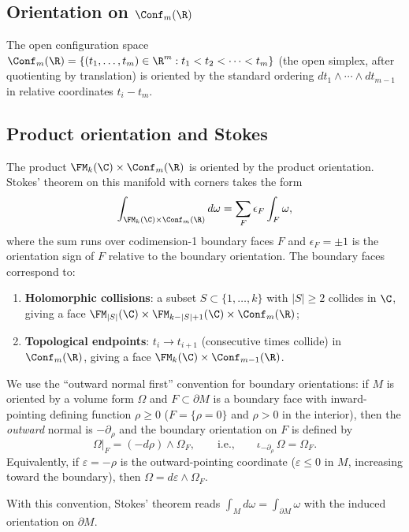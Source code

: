 \subsection{\texorpdfstring{Orientation on $\Conf_m(\R)$}{Orientation on Conf m(R)}}

The open configuration space $\Conf_m(\R) = \{(t_1,\ldots,t_m) \in \R^m : t_1 < t_2 < \cdots < t_m\}$ (the open simplex, after quotienting by translation) is oriented by the standard ordering $dt_1 \wedge \cdots \wedge dt_{m-1}$ in relative coordinates $t_i - t_m$.

\subsection{Product orientation and Stokes}

The product $\FM_k(\C) \times \Conf_m(\R)$ is oriented by the product orientation. Stokes' theorem on this manifold with corners takes the form
\begin{equation}
\label{eq:stokes-general}
\int_{\FM_k(\C) \times \Conf_m(\R)} d\omega = \sum_{F} \epsilon_F \int_F \omega,
\end{equation}
where the sum runs over codimension-1 boundary faces $F$ and $\epsilon_F = \pm 1$ is the orientation sign of $F$ relative to the boundary orientation. The boundary faces correspond to:
\begin{enumerate}
\item \textbf{Holomorphic collisions}: a subset $S \subset \{1,\ldots,k\}$ with $|S| \geq 2$ collides in $\C$, giving a face $\FM_{|S|}(\C) \times \FM_{k-|S|+1}(\C) \times \Conf_m(\R)$;
\item \textbf{Topological endpoints}: $t_i \to t_{i+1}$ (consecutive times collide) in $\Conf_m(\R)$, giving a face $\FM_k(\C) \times \Conf_{m-1}(\R)$.
\end{enumerate}

\begin{convention}
\label{conv:outward-normal}
We use the ``outward normal first'' convention for boundary orientations: if $M$ is oriented by a volume form $\Omega$ and $F\subset \partial M$ is a boundary face with inward-pointing defining function $\rho \ge 0$ ($F = \{\rho = 0\}$ and $\rho > 0$ in the interior), then the \emph{outward} normal is $-\partial_\rho$ and the boundary orientation on $F$ is defined by
\begin{equation}
\label{eq:outward-normal-rule}
\Omega\big|_F = (-d\rho) \wedge \Omega_F, \qquad\text{i.e.,}\qquad \iota_{-\partial_\rho}\,\Omega = \Omega_F.
\end{equation}
Equivalently, if $\varepsilon = -\rho$ is the outward-pointing coordinate ($\varepsilon \le 0$ in $M$, increasing toward the boundary), then $\Omega = d\varepsilon \wedge \Omega_F$.

With this convention, Stokes' theorem reads $\int_M d\omega = \int_{\partial M}\omega$ with the induced orientation on $\partial M$.
\end{convention}

